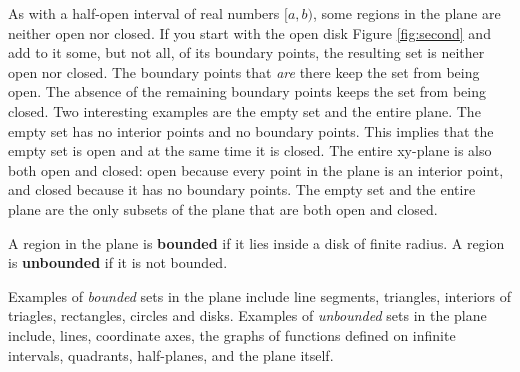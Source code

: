 \documentclass[12pt,a4paper]{article}
\newenvironment{definition}{\begin{definitionbox}}{\end{definitionbox}\vspace{1\baselineskip}}
\begin{document}
\noindent As with a half-open interval of real numbers \([a,b)\), some regions in the plane are neither open nor closed. If you start with the open disk Figure \ref{fig:second} and add to it some, but not all, of its boundary points, the resulting set is neither open nor closed. The boundary points that \textit{are} there keep the set from being open. The absence of the remaining boundary points keeps the set from being closed. Two interesting examples are the empty set and the entire plane. The empty set has no interior points and no boundary points. This implies that the empty set is open and at the same time it is closed. The entire xy-plane is also both open and closed: open because every point in the plane is an interior point, and closed because it has no boundary points. The empty set and the entire plane are the only subsets of the plane that are both open and closed.

\begin{definition}
    A region in the plane is \textbf{bounded} if it lies inside a disk of finite radius. A region is \textbf{unbounded} if it is not bounded.
    
\end{definition}
Examples of \textit{bounded} sets in the plane include line segments, triangles, interiors of triagles, rectangles, circles and disks. Examples of \textit{unbounded} sets in the plane include, lines, coordinate axes, the graphs of functions defined on infinite intervals, quadrants, half-planes, and the plane itself.

\newpage
\end{document}

